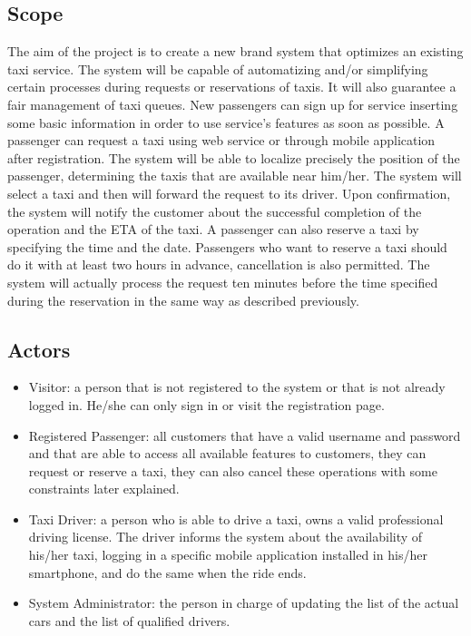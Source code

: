 \documentclass[a4paper,12pt,dvipsnames]{article}%
\begin{document}
\subsection{Scope}
The aim of the project is to create a new brand system that optimizes an 
existing taxi service.
The system will be capable of automatizing  and/or simplifying certain 
processes during requests or reservations of taxis.
It will also guarantee a fair management of taxi queues.
New passengers can sign up for service inserting some basic information in order to use service's features as soon as possible.
A passenger can request a taxi using web service or through mobile
application after registration. The system will be able to localize precisely the position
of the passenger, determining the taxis that are available near
him/her. The system will select a taxi and then will forward the request to its driver.
Upon confirmation, the system will notify the customer about the successful completion of the operation and the ETA of the taxi. A passenger can also reserve a taxi by specifying the time and the date.
Passengers who want to reserve a taxi should do it with at least two hours in advance, cancellation is also permitted. The system will actually process the request ten minutes before the time specified during the reservation in the same way as described previously.

\subsection{Actors}
\begin{itemize}
\item Visitor: a person that is not registered to the system or that is not already logged in. He/she can only sign in or visit the registration page.
\item Registered Passenger: all customers that have a valid username and password and that are able to access all available features to customers, they can request or reserve a taxi, they can also cancel these operations with some constraints later explained.
\item Taxi Driver: a person who is able to drive a taxi, owns a valid 
professional driving license. The driver informs the system about the availability of his/her taxi, logging in a specific mobile application installed in his/her smartphone, and do the same when the ride ends. 
\item System Administrator: the person in charge of updating the list of the actual cars and the list of qualified drivers.
\end{itemize}
\end{document}
